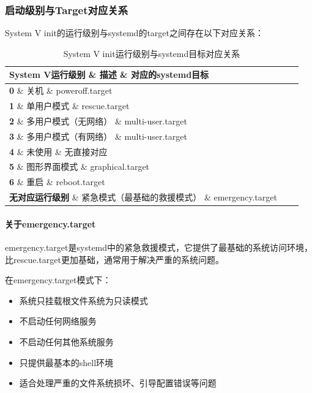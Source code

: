 \documentclass[12pt,UTF8]{ctexbook}
\begin{document}
\subsubsection{启动级别与Target对应关系}
System V init的运行级别与systemd的target之间存在以下对应关系：

\begin{table}[htbp]
    \centering
    \begin{tabularx}{\textwidth}{|X|X|X|}
        \hline
        \textbf{System V运行级别} \& \textbf{描述} \& \textbf{对应的systemd目标} \\
        \hline
        \textbf{0} \& 关机 \& poweroff.target \\
        \hline
        \textbf{1} \& 单用户模式 \& rescue.target \\
        \hline
        \textbf{2} \& 多用户模式（无网络） \& multi-user.target \\
        \hline
        \textbf{3} \& 多用户模式（有网络） \& multi-user.target \\
        \hline
        \textbf{4} \& 未使用 \& 无直接对应 \\
        \hline
        \textbf{5} \& 图形界面模式 \& graphical.target \\
        \hline
        \textbf{6} \& 重启 \& reboot.target \\
        \hline
        \textbf{无对应运行级别} \& 紧急模式（最基础的救援模式） \& emergency.target \\
        \hline
    \end{tabularx}
    \caption{System V init运行级别与systemd目标对应关系}
    \label{tab:runlevel\_target\_mapping}
\end{table}

\paragraph{关于emergency.target}
emergency.target是systemd中的紧急救援模式，它提供了最基础的系统访问环境，比rescue.target更加基础，通常用于解决严重的系统问题。

在emergency.target模式下：
\begin{itemize}
    \item 系统只挂载根文件系统为只读模式
    \item 不启动任何网络服务
    \item 不启动任何其他系统服务
    \item 只提供最基本的shell环境
    \item 适合处理严重的文件系统损坏、引导配置错误等问题
\end{itemize}
\end{document}
